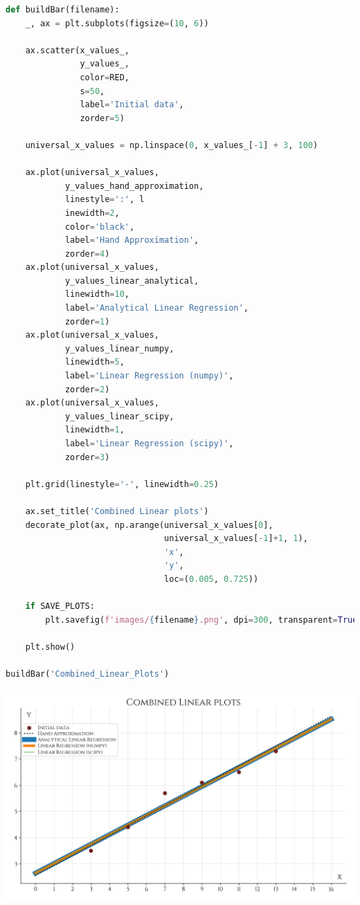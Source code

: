 \documentclass[a4paper, 14pt]{extarticle}
\begin{document}
\begin{center}
    \begin{lstlisting}[language=Python]
def buildBar(filename):
    _, ax = plt.subplots(figsize=(10, 6))

    ax.scatter(x_values_, 
               y_values_, 
               color=RED,
               s=50,
               label='Initial data',
               zorder=5)

    universal_x_values = np.linspace(0, x_values_[-1] + 3, 100)

    ax.plot(universal_x_values, 
            y_values_hand_approximation, 
            linestyle=':', l
            inewidth=2, 
            color='black', 
            label='Hand Approximation', 
            zorder=4)
    ax.plot(universal_x_values, 
            y_values_linear_analytical, 
            linewidth=10, 
            label='Analytical Linear Regression', 
            zorder=1)
    ax.plot(universal_x_values, 
            y_values_linear_numpy, 
            linewidth=5, 
            label='Linear Regression (numpy)', 
            zorder=2)
    ax.plot(universal_x_values, 
            y_values_linear_scipy, 
            linewidth=1, 
            label='Linear Regression (scipy)', 
            zorder=3)

    plt.grid(linestyle='-', linewidth=0.25)

    ax.set_title('Combined Linear plots')
    decorate_plot(ax, np.arange(universal_x_values[0], 
                                universal_x_values[-1]+1, 1), 
                                'x', 
                                'y', 
                                loc=(0.005, 0.725))
    
    if SAVE_PLOTS:
        plt.savefig(f'images/{filename}.png', dpi=300, transparent=True)

    plt.show()

buildBar('Combined_Linear_Plots')
    \end{lstlisting}
\end{center}

\begin{center}
    \includegraphics[width=1\textwidth, height=1\textheight, keepaspectratio]{Combined_Linear_Plots} \\
\end{center}
\end{document}
